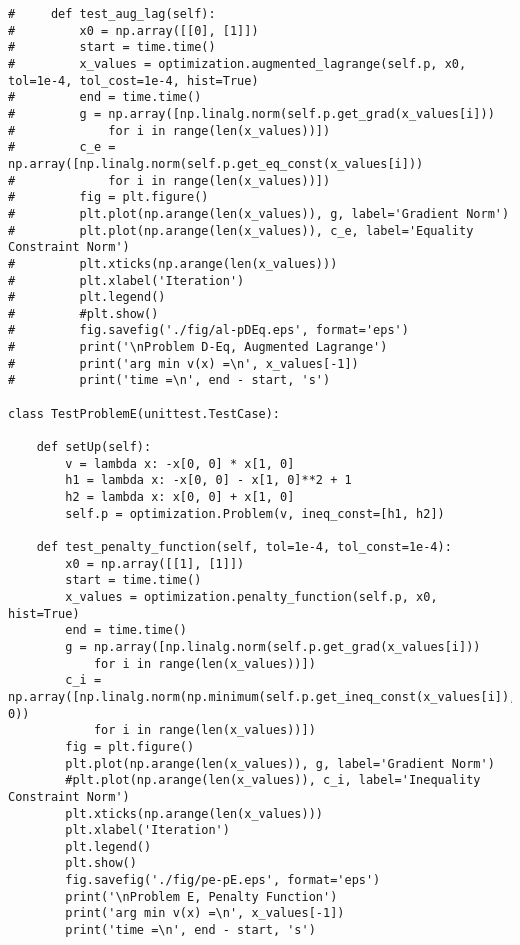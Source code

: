 \begin{lstlisting}
#     def test_aug_lag(self):
#         x0 = np.array([[0], [1]])
#         start = time.time()
#         x_values = optimization.augmented_lagrange(self.p, x0, tol=1e-4, tol_cost=1e-4, hist=True)
#         end = time.time()
#         g = np.array([np.linalg.norm(self.p.get_grad(x_values[i]))
#             for i in range(len(x_values))])
#         c_e = np.array([np.linalg.norm(self.p.get_eq_const(x_values[i]))
#             for i in range(len(x_values))])
#         fig = plt.figure()
#         plt.plot(np.arange(len(x_values)), g, label='Gradient Norm')
#         plt.plot(np.arange(len(x_values)), c_e, label='Equality Constraint Norm')
#         plt.xticks(np.arange(len(x_values)))
#         plt.xlabel('Iteration')
#         plt.legend()
#         #plt.show()
#         fig.savefig('./fig/al-pDEq.eps', format='eps')
#         print('\nProblem D-Eq, Augmented Lagrange')
#         print('arg min v(x) =\n', x_values[-1])
#         print('time =\n', end - start, 's')

class TestProblemE(unittest.TestCase):

    def setUp(self):
        v = lambda x: -x[0, 0] * x[1, 0]
        h1 = lambda x: -x[0, 0] - x[1, 0]**2 + 1
        h2 = lambda x: x[0, 0] + x[1, 0]
        self.p = optimization.Problem(v, ineq_const=[h1, h2])

    def test_penalty_function(self, tol=1e-4, tol_const=1e-4):
        x0 = np.array([[1], [1]])
        start = time.time()
        x_values = optimization.penalty_function(self.p, x0, hist=True)
        end = time.time()
        g = np.array([np.linalg.norm(self.p.get_grad(x_values[i]))
            for i in range(len(x_values))])
        c_i = np.array([np.linalg.norm(np.minimum(self.p.get_ineq_const(x_values[i]), 0))
            for i in range(len(x_values))])
        fig = plt.figure()
        plt.plot(np.arange(len(x_values)), g, label='Gradient Norm')
        #plt.plot(np.arange(len(x_values)), c_i, label='Inequality Constraint Norm')
        plt.xticks(np.arange(len(x_values)))
        plt.xlabel('Iteration')
        plt.legend()
        plt.show()
        fig.savefig('./fig/pe-pE.eps', format='eps')
        print('\nProblem E, Penalty Function')
        print('arg min v(x) =\n', x_values[-1])
        print('time =\n', end - start, 's')
    

\end{lstlisting}
